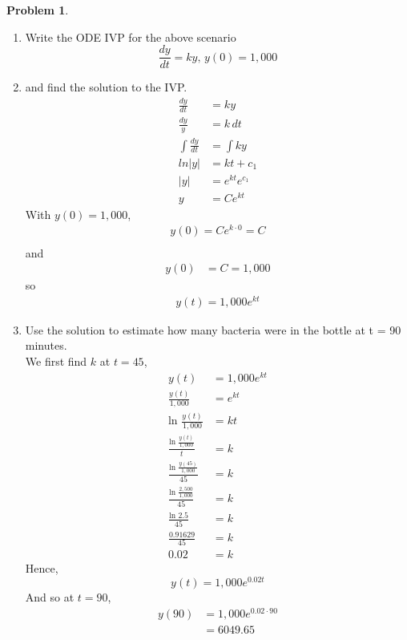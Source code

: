 \documentclass[10pt,leqno ]{article}
\theoremstyle{definition}
\newtheorem{problem}[theorem]{Problem}
\begin{document}
\begin{problem}
\begin{enumerate}
\item Write the ODE IVP for the above scenario
\begin{equation*}
\frac{dy}{dt} = ky, \, y(0) = 1,000
\end{equation*}
\item and find the solution to the IVP.
\begin{align*}
    \frac{dy}{dt} &= ky \\
    \frac{dy}{y} &= k\, dt \\
    \int \frac{dy}{dt} &= \int ky \\
    ln |y| &= kt + c_1 \\
    |y| &= e^{kt}e^{c_1} \\
    y &= Ce^{kt}
\end{align*}
With $y(0) = 1,000$,
\begin{align*}
y(0) = Ce^{k \cdot 0} = C \\
\end{align*}
and
\begin{align*}
y(0) &= C = 1,000
\end{align*}
so
\begin{align*}
y(t) = 1,000 e^{kt}
\end{align*}
\item Use the solution to estimate how many bacteria were in the bottle at t = 90 minutes.
\\
We first find $k$ at $t = 45$,
\begin{align*}
y(t) &= 1,000e^{kt} \\
\frac{y(t)}{1,000} &= e^{kt} \\
\text{ln } \frac{y(t)}{1,000} &= kt \\
\frac{\text{ln } \frac{y(t)}{1,000}}{t} &= k \\
\frac{\text{ln } \frac{y(45)}{1,000}}{45} &= k \\
\frac{\text{ln } \frac{2,500}{1,000}}{45} &= k \\
\frac{\text{ln } 2.5}{45} &= k \\
\frac{0.91629}{45} &= k \\
0.02 &= k
\end{align*}
Hence,
\begin{equation*}
y(t) = 1,000e^{0.02t}
\end{equation*}
And so at $t = 90$,
\begin{align*}
y(90) &= 1,000 e^{0.02 \cdot 90} \\
         &= 6049.65
\end{align*}
\end{enumerate}


\end{problem}
\end{document}
